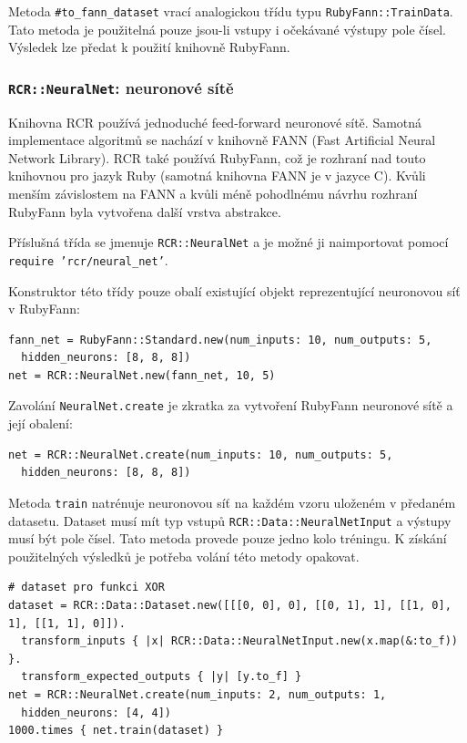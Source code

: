 \documentclass[a4paper]{article}
\begin{document}
Metoda \texttt{\#to\_fann\_dataset} vrací analogickou třídu typu
\texttt{RubyFann::TrainData}. Tato metoda je použitelná pouze jsou-li vstupy i
očekávané výstupy pole čísel. Výsledek lze předat k použití knihovně RubyFann.

\subsubsection{\texttt{RCR::NeuralNet}: neuronové sítě}
Knihovna RCR používá jednoduché feed-forward neuronové sítě. Samotná
implementace algoritmů se nachází v knihovně FANN (Fast Artificial Neural %
Network Library). RCR také používá RubyFann, což je rozhraní nad touto knihovnou
pro jazyk Ruby (samotná knihovna FANN je v jazyce C). Kvůli menším závislostem
na FANN a kvůli méně pohodlnému návrhu rozhraní RubyFann byla vytvořena další
vrstva abstrakce.

Příslušná třída se jmenuje \texttt{RCR::NeuralNet} a je možné ji naimportovat
pomocí \texttt{require 'rcr/neural\_net'}.

Konstruktor této třídy pouze obalí existující objekt reprezentující neuronovou
síť v RubyFann:
\begin{lstlisting}
fann_net = RubyFann::Standard.new(num_inputs: 10, num_outputs: 5,
  hidden_neurons: [8, 8, 8])
net = RCR::NeuralNet.new(fann_net, 10, 5)
\end{lstlisting}

Zavolání \texttt{NeuralNet.create} je zkratka za vytvoření RubyFann neuronové
sítě a její obalení:
\begin{lstlisting}
net = RCR::NeuralNet.create(num_inputs: 10, num_outputs: 5,
  hidden_neurons: [8, 8, 8])
\end{lstlisting}

Metoda \texttt{train} natrénuje neuronovou síť na každém vzoru uloženém
v předaném datasetu. Dataset musí mít typ vstupů \texttt{RCR::Data::NeuralNetInput} a
výstupy musí být pole čísel. Tato metoda provede pouze jedno kolo tréningu.
K získání použitelných výsledků je potřeba volání této metody opakovat.
\begin{lstlisting}
# dataset pro funkci XOR
dataset = RCR::Data::Dataset.new([[[0, 0], 0], [[0, 1], 1], [[1, 0], 1], [[1, 1], 0]]).
  transform_inputs { |x| RCR::Data::NeuralNetInput.new(x.map(&:to_f)) }.
  transform_expected_outputs { |y| [y.to_f] }
net = RCR::NeuralNet.create(num_inputs: 2, num_outputs: 1,
  hidden_neurons: [4, 4])
1000.times { net.train(dataset) }
\end{lstlisting}
\end{document}
